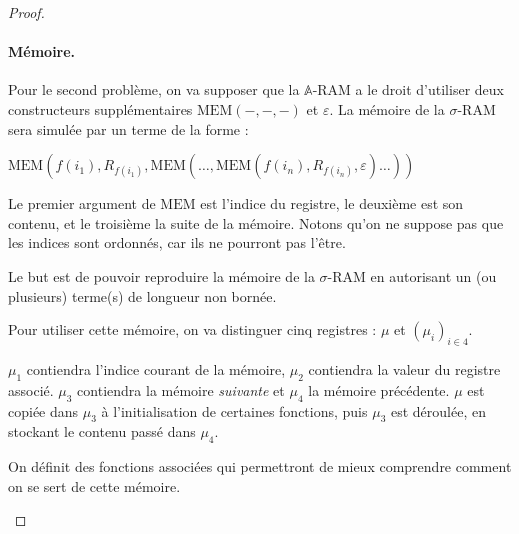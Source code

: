 \documentclass{report}
\newcommand{\bbA}{\mathbb{A}}
\begin{document}
\begin{proof}
					
					\paragraph{Mémoire.}
					\label{par:A_RAM_memoire}
					Pour le second problème, on va supposer que la $\bbA$-RAM a le droit d'utiliser deux constructeurs supplémentaires $\text{MEM}(-,-,-)$ et $\varepsilon$. La mémoire de la $\sigma$-RAM sera simulée par un terme de la forme : 
					
					$\text{MEM}(f(i_1), R_{f(i_1)}, \text{MEM}( \dots, \text{MEM}(f(i_n), R_{f(i_n)}, \varepsilon) \dots ) )$
					
					Le premier argument de $\text{MEM}$ est l'indice du registre, le deuxième est son contenu, et le troisième la suite de la mémoire. Notons qu'on ne suppose pas que les indices sont ordonnés, car ils ne pourront pas l'être. 
					
					Le but est de pouvoir reproduire la mémoire de la $\sigma$-RAM en autorisant un (ou plusieurs) terme(s) de longueur non bornée. 
					
					Pour utiliser cette mémoire, on va distinguer cinq registres : $\mu$ et $\left( \mu_i \right)_{i \in 4}$.
					
					$\mu_1$ contiendra l'indice courant de la mémoire, $\mu_2$ contiendra la valeur du registre associé. $\mu_3$ contiendra la mémoire \emph{suivante} et $\mu_4$ la mémoire précédente. $\mu$ est copiée dans $\mu_3$ à l'initialisation de certaines fonctions, puis $\mu_3$ est déroulée, en stockant le contenu passé dans $\mu_4$. 
					
					On définit des fonctions associées qui permettront de mieux comprendre comment on se sert de cette mémoire. 
					
					\espace
					
					\begin{algorithm}[H]
						\label{algo:A_RAM_fn_INSERT}
						
						
						

\end{algorithm}
\end{proof}
\end{document}
